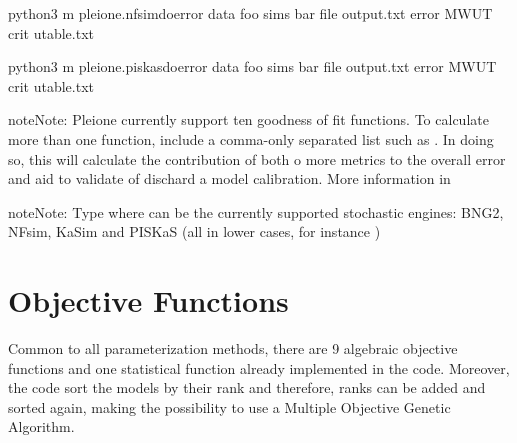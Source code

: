 \documentclass[letterpaper,10pt,english]{sphinxmanual}
\begin{document}

%
\begin{sphinxVerbatim}[commandchars=\\\{\}]
python3 \PYGZhy{}m pleione.nfsim\PYGZhy{}doerror \PYGZhy{}\PYGZhy{}data foo \PYGZhy{}\PYGZhy{}sims bar 
\PYGZhy{}\PYGZhy{}file output.txt \PYGZhy{}\PYGZhy{}error MWUT \PYGZhy{}\PYGZhy{}crit utable.txt
\end{sphinxVerbatim}


%
\begin{sphinxVerbatim}[commandchars=\\\{\}]
python3 \PYGZhy{}m pleione.piskas\PYGZhy{}doerror \PYGZhy{}\PYGZhy{}data foo \PYGZhy{}\PYGZhy{}sims bar 
\PYGZhy{}\PYGZhy{}file output.txt \PYGZhy{}\PYGZhy{}error MWUT \PYGZhy{}\PYGZhy{}crit utable.txt
\end{sphinxVerbatim}

\begin{sphinxadmonition}{note}{Note:}
Pleione currently support ten goodness of fit functions. To calculate more
than one function, include a comma-only separated list such as .
In doing so, this will calculate the contribution of both o more metrics to
the overall error and aid to validate of dischard a model calibration.
More information in {\hyperref[\detokenize{ObjectiveFunctions:fitneess-functions}]{}}
\end{sphinxadmonition}

\begin{sphinxadmonition}{note}{Note:}
Type  where
 can be the currently supported stochastic engines: BNG2,
NFsim, KaSim and PISKaS (all in lower cases, for instance )
\end{sphinxadmonition}


\section{Objective Functions}
\label{\detokenize{ObjectiveFunctions:objective-functions}}\label{\detokenize{ObjectiveFunctions:fitneess-functions}}\label{\detokenize{ObjectiveFunctions::doc}}
Common to all parameterization methods, there are 9 algebraic objective
functions and one statistical function already implemented in the code.
Moreover, the code sort the models by their rank and therefore, ranks can be
added and sorted again, making the possibility to use a Multiple Objective
Genetic Algorithm.
\end{document}
